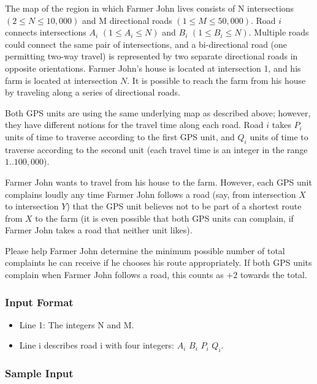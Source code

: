 The map of the region in which Farmer John lives consists of N intersections $(2 \leq N \leq 10,000)$ and M directional roads $(1 \leq M \leq 50,000)$.  
Road $i$ connects intersections $A_i$ $(1 \leq A_i \leq N)$ and $B_i$ $(1 \leq B_i \leq N)$. 
Multiple roads could connect the same pair of intersections, and a bi-directional road (one permitting two-way travel) is represented 
by two separate directional roads in opposite orientations.  
Farmer John's house is located at intersection 1, and his farm is located at intersection $N$.  
It is possible to reach the farm from his house by traveling along a series of directional roads.

Both GPS units are using the same underlying map as described above; however, they have different notions for the travel time along each road. 
Road $i$ takes $P_i$ units of time to traverse according to the first GPS unit, and $Q_i$ units of time to traverse according to the second unit 
(each travel time is an integer in the range $1..100,000$).

Farmer John wants to travel from his house to the farm.  
However, each GPS unit complains loudly any time Farmer John follows a road (say, from intersection $X$ to intersection $Y$) that the GPS unit believes 
not to be part of a shortest route from $X$ to the farm (it is even possible that both GPS units can complain, 
if Farmer John takes a road that neither unit likes). 

Please help Farmer John determine the minimum possible number of total complaints he can receive if he chooses his route appropriately.  
If both GPS units complain when Farmer John follows a road, this counts as $+2$ towards the total.

\subsubsection{Input Format}
\begin{itemize}
	\item Line 1: The integers N and M. 
	\item Line i describes road i with four integers: $A_i$ $B_i$ $P_i$ $Q_i$. 
\end{itemize}

\subsubsection{Sample Input}

